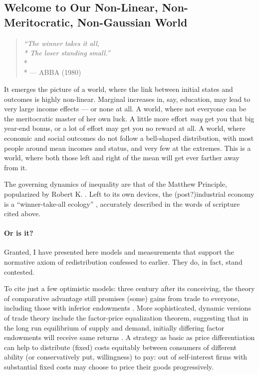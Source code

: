\subsection[Our Non-Linear/Meritocratic/Gaussian World]{Welcome to Our Non-Linear, Non-Meritocratic, Non-Gaussian World} 

\begin{quote}
	\emph{``The winner takes it all,\\*
	The loser standing small.''}\\*\\*
	--- ABBA (1980)
\end{quote}

It emerges the picture of a world, where the link between initial states and outcomes is highly non-linear. Marginal increases in, say, education, may lead to very large income effects --- or none at all. A world, where not everyone can be the meritocratic master of her own luck. A little more effort \emph{may} get you that big year-end bonus, or a lot of effort may get you no reward at all. A world, where economic and social outcomes do not follow a bell-shaped distribution, with most people around mean incomes and status, and very few at the extremes. This is a world, where both those left and right of the mean will get ever farther away from it.

The governing dynamics of inequality are that of the Matthew Principle, popularized by Robert K. \cite{Merton1988, Jackson1968}. Left to its own devices, the (post?)industrial economy is a ``winner-take-all ecology'' \citep{Taleb2007}, accurately described in the words of scripture cited above. 

\paragraph{Or is it?} Granted, I have presented here models and measurements that support the normative axiom of redistribution confessed to earlier. They do, in fact, stand contested. 

To cite just a few optimistic models: three century after its conceiving, the theory of comparative advantage still promises (some) gains from trade to everyone, including those with inferior endowments \citep{Ricardo1817}. More sophisticated, dynamic versions of trade theory include the factor-price equalization theorem, suggesting that in the long run equilibrium of supply and demand, initially differing factor endowments will receive same returns \citep{Stolper1941}. A strategy as basic as price differentiation can help to distribute (fixed) costs equitably between consumers of different ability (or conservatively put, willingness) to pay: out of self-interest firms with substantial fixed costs may choose to price their goods progressively.

